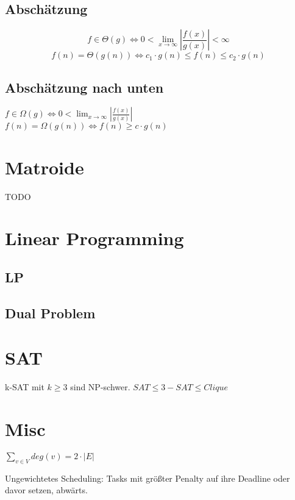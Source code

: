 \documentclass[10pt,a4paper]{article}
\newcommand{\abs}[1]{\ensuremath{\left\vert#1\right\vert}}
\begin{document}
\subsection{Abschätzung}
\[f \in \Theta(g) \Leftrightarrow 0 <\lim_{x \rightarrow \infty} \abs{\frac{f(x)}{g(x)}} < \infty \]
\[f(n) = \Theta(g(n)) \Leftrightarrow c_1 \cdot g(n) \leq f(n) \leq c_2 \cdot g(n)\]
\subsection{Abschätzung nach unten}
$f \in \Omega(g) \Leftrightarrow 0 < \lim_{x \rightarrow \infty} \abs{\frac{f(x)}{g(x)}}$ \,\,\,\,\,\,\,\,\,\,\,\,\,\,\,\,\,\,\,\,\,\,\,\,\,\,\,\,\,\,\,\,\,\,\,\,\,\,\, $f(n) = \Omega(g(n)) \Leftrightarrow f(n) \geq c \cdot g(n)$
\section{Matroide}
TODO
\section{Linear Programming}
\subsection{LP}
\subsection{Dual Problem}
\section{SAT}
k-SAT mit $k \geq 3$ sind NP-schwer.
$SAT \leq 3-SAT \leq Clique$
\section{Misc}
$\sum\limits_{v \in V} deg(v) = 2 \cdot |E|$

Ungewichtetes Scheduling: Tasks mit größter Penalty auf ihre Deadline oder davor setzen, abwärts.
\end{document}
